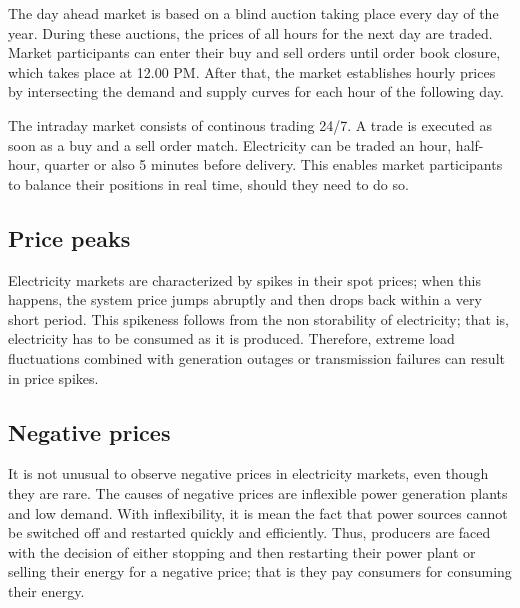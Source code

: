 The day ahead market is based on a blind auction taking place every day of the year.
During these auctions, the prices of all hours for the next day are traded.
Market participants can enter their buy and sell orders until order book closure, which takes place at 12.00 PM. After that, the market establishes hourly prices by intersecting the demand and supply curves for each hour of the following day.

The intraday market consists of continous trading 24/7. A trade is executed as soon as a buy and a sell order match. Electricity can be traded an hour, half-hour, quarter or also 5 minutes before delivery. This enables market participants to balance their positions in real time, should they need to do so.

\subsection{Price peaks}
Electricity markets are characterized by spikes in their spot prices; when this happens, the system price jumps abruptly and then drops back within a very short period.
This spikeness follows from the non storability of electricity; that is, electricity has to be consumed as it is produced. Therefore, extreme load fluctuations combined with generation outages or transmission failures can result in price spikes.

\subsection{Negative prices}
It is not unusual to observe negative prices in electricity markets, even though they are rare.
The causes of negative prices are inflexible power generation plants and low demand. With inflexibility, it is mean the fact that power sources cannot be switched off and restarted quickly and efficiently.
Thus, producers are faced with the decision of either stopping and then restarting their power plant or selling their energy for a negative price; that is they pay consumers for consuming their energy.

